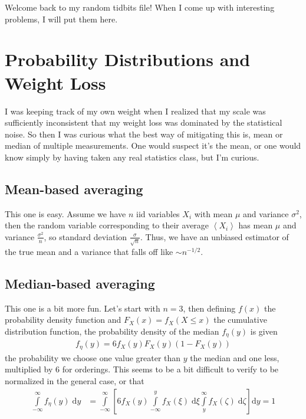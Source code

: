 \documentclass[10pt]{article}
\newcommand{\expvalue}[1]{\left<#1\right>}
\begin{document}
\pagestyle{fancy}
\cfoot{\thepage/\pageref{LastPage}}

Welcome back to my random tidbits file! When I come up with interesting
problems, I will put them here.

\section{Probability Distributions and Weight Loss}

I was keeping track of my own weight when I realized that my scale was
sufficiently inconsistent that my weight loss was dominated by the statistical
noise. So then I was curious what the best way of mitigating this is, mean or
median of multiple measurements. One would suspect it's the mean, or one would
know simply by having taken any real statistics class, but I'm curious.

\subsection{Mean-based averaging}

This one is easy. Assume we have $n$ iid variables $X_i$ with mean $\mu$ and
variance $\sigma^2$, then the random variable corresponding to their average
$\expvalue{X_i}$ has mean $\mu$ and variance $\frac{\sigma^2}{n}$, so standard
deviation $\frac{\sigma}{\sqrt{n}}$. Thus, we have an unbiased estimator of the
true mean and a variance that falls off like $\sim n^{-1/2}$.


\subsection{Median-based averaging}

This one is a bit more fun. Let's start with $n=3$, then defining $f(x)$ the
probability density function and $F_X(x) = f_X(X \leq x)$ the cumulative
distribution function, the probability density of the median $f_\eta(y)$ is
given
\begin{align}
    f_\eta(y) = 6f_X(y)F_X(y)\left( 1 - F_X(y) \right)\label{1-eta}
\end{align}
the probability we choose one value greater than $y$ the median and one less,
multiplied by $6$ for orderings. This seems to be a bit difficult to verify to
be normalized in the general case, or that
\begin{align}
    \int\limits_{-\infty}^{\infty}f_\eta(y)\;\mathrm{d}y &=
    \int\limits_{-\infty}^{\infty}\left[
        6f_X(y)\int\limits_{-\infty}^{y}f_X(\xi)\;\mathrm{d}\xi
        \int\limits_{y}^{\infty}f_X(\zeta)\;\mathrm{d}\zeta
    \right]\mathrm{d}y = 1
\end{align}
\end{document}
